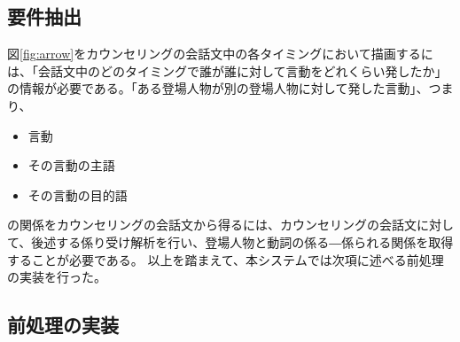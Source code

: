 \documentclass[shuuron]{kuee}
\begin{document}
%

\subsection{要件抽出}

図\ref{fig:arrow}をカウンセリングの会話文中の各タイミングにおいて描画するには、「会話文中のどのタイミングで誰が誰に対して言動をどれくらい発したか」の情報が必要である。「ある登場人物が別の登場人物に対して発した言動」、つまり、
\begin{itemize}
  \item 言動
  \item その言動の主語
  \item その言動の目的語
\end{itemize}
の関係をカウンセリングの会話文から得るには、カウンセリングの会話文に対して、後述する係り受け解析を行い、登場人物と動詞の係る―係られる関係を取得することが必要である。
以上を踏まえて、本システムでは次項に述べる前処理の実装を行った。







\subsection{前処理の実装}
\end{document}
